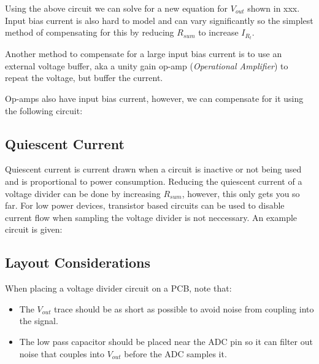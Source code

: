 \documentclass[main.tex]{subfiles}
\begin{document}
\noindent Using the above circuit we can solve for a new equation for $V_{out}$ shown in xxx. Input bias current is also hard to model and can vary significantly so the simplest method of compensating for this by reducing $R_{sum}$ to increase $I_{R_t}$. 

\noindent Another method to compensate for a large input bias current is to use an external voltage buffer, aka a unity gain op-amp (\textit{Operational Amplifier}) to repeat the voltage, but buffer the current. 


Op-amps also have input bias current, however, we can compensate for it using the following circuit:


\subsection{Quiescent Current}
Quiescent current is current drawn when a circuit is inactive or not being used and is proportional to power consumption. Reducing the quiescent current of a voltage divider can be done by increasing $R_{sum}$, however, this only gets you so far. For low power devices, transistor based circuits can be used to disable current flow when sampling the voltage divider is not neccessary. An example circuit is given:  


\subsection{Layout Considerations}
When placing a voltage divider circuit on a PCB, note that:
\begin{itemize}
    \item The $V_{out}$ trace should be as short as possible to avoid noise from coupling into the signal. 
    \item The low pass capacitor should be placed near the ADC pin so it can filter out noise that couples into $V_{out}$ before the ADC samples it.
\end{itemize}
\end{document}

